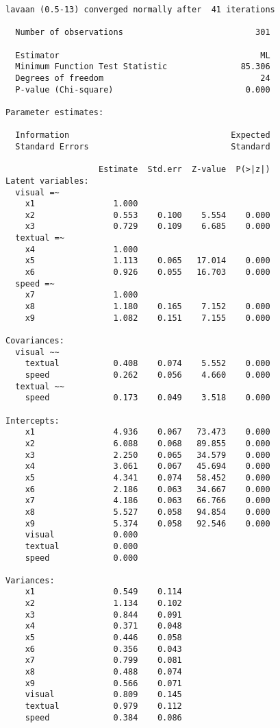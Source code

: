 \begin{verbatim}
lavaan (0.5-13) converged normally after  41 iterations

  Number of observations                           301

  Estimator                                         ML
  Minimum Function Test Statistic               85.306
  Degrees of freedom                                24
  P-value (Chi-square)                           0.000

Parameter estimates:

  Information                                 Expected
  Standard Errors                             Standard

                   Estimate  Std.err  Z-value  P(>|z|)
Latent variables:
  visual =~
    x1                1.000
    x2                0.553    0.100    5.554    0.000
    x3                0.729    0.109    6.685    0.000
  textual =~
    x4                1.000
    x5                1.113    0.065   17.014    0.000
    x6                0.926    0.055   16.703    0.000
  speed =~
    x7                1.000
    x8                1.180    0.165    7.152    0.000
    x9                1.082    0.151    7.155    0.000

Covariances:
  visual ~~
    textual           0.408    0.074    5.552    0.000
    speed             0.262    0.056    4.660    0.000
  textual ~~
    speed             0.173    0.049    3.518    0.000

Intercepts:
    x1                4.936    0.067   73.473    0.000
    x2                6.088    0.068   89.855    0.000
    x3                2.250    0.065   34.579    0.000
    x4                3.061    0.067   45.694    0.000
    x5                4.341    0.074   58.452    0.000
    x6                2.186    0.063   34.667    0.000
    x7                4.186    0.063   66.766    0.000
    x8                5.527    0.058   94.854    0.000
    x9                5.374    0.058   92.546    0.000
    visual            0.000
    textual           0.000
    speed             0.000

Variances:
    x1                0.549    0.114
    x2                1.134    0.102
    x3                0.844    0.091
    x4                0.371    0.048
    x5                0.446    0.058
    x6                0.356    0.043
    x7                0.799    0.081
    x8                0.488    0.074
    x9                0.566    0.071
    visual            0.809    0.145
    textual           0.979    0.112
    speed             0.384    0.086
\end{verbatim}

